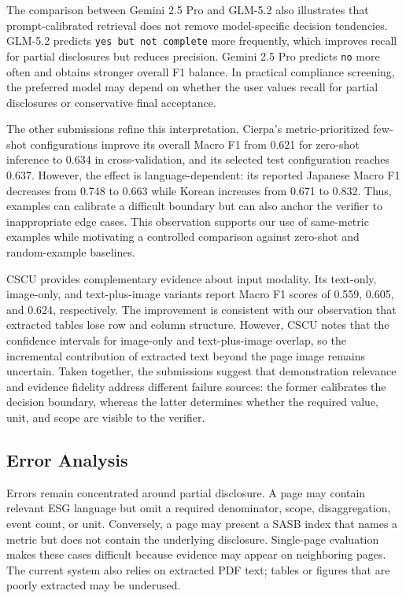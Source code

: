 \documentclass[sigconf,article]{acmart}
\begin{document}
The comparison between Gemini 2.5 Pro and GLM-5.2 also illustrates that prompt-calibrated retrieval does not remove model-specific decision tendencies. GLM-5.2 predicts \texttt{yes but not complete} more frequently, which improves recall for partial disclosures but reduces precision. Gemini 2.5 Pro predicts \texttt{no} more often and obtains stronger overall F1 balance. In practical compliance screening, the preferred model may depend on whether the user values recall for partial disclosures or conservative final acceptance.

The other submissions refine this interpretation. Cierpa's metric-prioritized few-shot configurations improve its overall Macro F1 from 0.621 for zero-shot inference to 0.634 in cross-validation, and its selected test configuration reaches 0.637. However, the effect is language-dependent: its reported Japanese Macro F1 decreases from 0.748 to 0.663 while Korean increases from 0.671 to 0.832. Thus, examples can calibrate a difficult boundary but can also anchor the verifier to inappropriate edge cases. This observation supports our use of same-metric examples while motivating a controlled comparison against zero-shot and random-example baselines.

CSCU provides complementary evidence about input modality. Its text-only, image-only, and text-plus-image variants report Macro F1 scores of 0.559, 0.605, and 0.624, respectively. The improvement is consistent with our observation that extracted tables lose row and column structure. However, CSCU notes that the confidence intervals for image-only and text-plus-image overlap, so the incremental contribution of extracted text beyond the page image remains uncertain. Taken together, the submissions suggest that demonstration relevance and evidence fidelity address different failure sources: the former calibrates the decision boundary, whereas the latter determines whether the required value, unit, and scope are visible to the verifier.

\subsection{Error Analysis}
Errors remain concentrated around partial disclosure. A page may contain relevant ESG language but omit a required denominator, scope, disaggregation, event count, or unit. Conversely, a page may present a SASB index that names a metric but does not contain the underlying disclosure. Single-page evaluation makes these cases difficult because evidence may appear on neighboring pages. The current system also relies on extracted PDF text; tables or figures that are poorly extracted may be underused.
\end{document}
